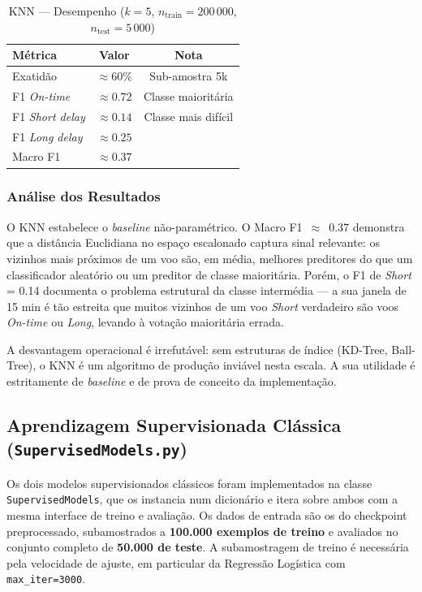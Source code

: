 \documentclass[conference]{IEEEtran}
\begin{document}
\begin{table}[h]
\centering
\caption{KNN — Desempenho ($k=5$, $n_{\text{train}}=200\,000$, $n_{\text{test}}=5\,000$)}
\label{tab:knn}
\begin{tabular}{lcc}
\toprule
\textbf{Métrica} & \textbf{Valor} & \textbf{Nota} \\
\midrule
Exatidão        & $\approx 60\%$ & Sub-amostra 5k \\
F1 \textit{On-time}     & $\approx 0.72$ & Classe maioritária \\
F1 \textit{Short delay} & $\approx 0.14$ & Classe mais difícil \\
F1 \textit{Long delay}  & $\approx 0.25$ & \\
Macro F1        & $\approx 0.37$ & \\
\bottomrule
\end{tabular}
\end{table}

\subsubsection{Análise dos Resultados}
O KNN estabelece o \textit{baseline} não-paramétrico. O Macro F1~$\approx$~0.37
demonstra que a distância Euclidiana no espaço escalonado captura sinal relevante:
os vizinhos mais próximos de um voo são, em média, melhores preditores do que
um classificador aleatório ou um preditor de classe maioritária. Porém, o F1
de \textit{Short} = 0.14 documenta o problema estrutural da classe intermédia —
a sua janela de 15 min é tão estreita que muitos vizinhos de um voo
\textit{Short} verdadeiro são voos \textit{On-time} ou \textit{Long}, levando à
votação maioritária errada.

A desvantagem operacional é irrefutável: sem estruturas de índice
(KD-Tree, Ball-Tree), o KNN é um algoritmo de produção inviável nesta escala.
A sua utilidade é estritamente de \textit{baseline} e de prova de conceito
da implementação.

\subsection{Aprendizagem Supervisionada Clássica (\texttt{SupervisedModels.py})}

Os dois modelos supervisionados clássicos foram implementados na classe
\texttt{SupervisedModels}, que os instancia num dicionário e itera sobre ambos
com a mesma interface de treino e avaliação. Os dados de entrada são os do
checkpoint preprocessado, subamostrados a \textbf{100.000 exemplos de treino}
e avaliados no conjunto completo de \textbf{50.000 de teste}. A subamostragem
de treino é necessária pela velocidade de ajuste, em particular da Regressão
Logística com \texttt{max\_iter=3000}.
\end{document}
